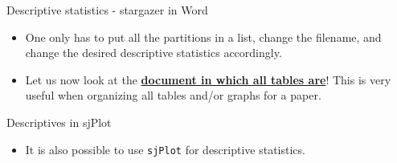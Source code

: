 \documentclass[
  10pt,
  ignorenonframetext,
]{beamer}
\newenvironment{Shaded}{\begin{snugshade}}{\end{snugshade}}
\newcommand{\CommentTok}[1]{\textcolor[rgb]{0.56,0.35,0.01}{\textit{#1}}}
\newcommand{\DataTypeTok}[1]{\textcolor[rgb]{0.13,0.29,0.53}{#1}}
\newcommand{\KeywordTok}[1]{\textcolor[rgb]{0.13,0.29,0.53}{\textbf{#1}}}
\newcommand{\NormalTok}[1]{#1}
\newcommand{\OperatorTok}[1]{\textcolor[rgb]{0.81,0.36,0.00}{\textbf{#1}}}
\newcommand{\OtherTok}[1]{\textcolor[rgb]{0.56,0.35,0.01}{#1}}
\newcommand{\StringTok}[1]{\textcolor[rgb]{0.31,0.60,0.02}{#1}}
\providecommand{\tightlist}{%
  \setlength{\itemsep}{0pt}\setlength{\parskip}{0pt}}
\begin{document}
\begin{frame}{Descriptive statistics - stargazer in Word}
\protect\hypertarget{descriptive-statistics---stargazer-in-word-4}{}

\begin{itemize}
\item
  One only has to put all the partitions in a list, change the filename,
  and change the desired descriptive statistics accordingly.
\item
  Let us now look at the \href{tables.doc}{\textbf{document in which all
  tables are}}! This is very useful when organizing all tables and/or
  graphs for a paper.
\end{itemize}

\end{frame}

\begin{frame}[fragile]{Descriptives in sjPlot}
\protect\hypertarget{descriptives-in-sjplot}{}

\begin{itemize}
\tightlist
\item
  It is also possible to use \texttt{sjPlot} for descriptive statistics.
  \footnotesize
\end{itemize}

\begin{Shaded}
\end{Shaded}

\normalsize

\end{frame}
\end{document}
